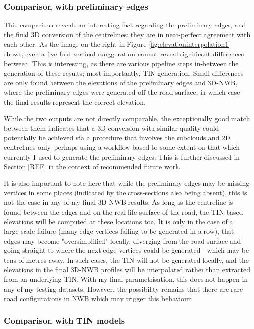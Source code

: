 \subsubsection{Comparison with preliminary edges}

This comparison reveals an interesting fact regarding the preliminary edges, and the final 3D conversion of the centrelines: they are in near-perfect agreement with each other. As the image on the right in Figure \ref{fig:elevationinterpolation1} shows, even a five-fold vertical exaggeration cannot reveal significant differences between. This is interesting, as there are various pipeline steps in-between the generation of these results; most importantly, TIN generation. Small differences are only found between the elevations of the preliminary edges and 3D-NWB, where the preliminary edges were generated off the road surface, in which case the final results represent the correct elevation.

While the two outputs are not directly comparable, the exceptionally good match between them indicates that a 3D conversion with similar quality could potentially be achieved via a procedure that involves the subclouds and 2D centrelines only, perhaps using a workflow based to some extent on that which currently I used to generate the preliminary edges. This is further discussed in Section [REF] in the context of recommended future work.

It is also important to note here that while the preliminary edges may be missing vertices in some places (indicated by the cross-sections also being absent), this is not the case in any of my final 3D-NWB results. As long as the centreline is found between the edges and on the real-life surface of the road, the TIN-based elevations will be computed at these locations too. It is only in the case of a large-scale failure (many edge vertices failing to be generated in a row), that edges may become "oversimplified" locally, diverging from the road surface and going straight to where the next edge vertices could be generated - which may be tens of metres away. In such cases, the TIN will not be generated locally, and the elevations in the final 3D-NWB profiles will be interpolated rather than extracted from an underlying TIN. With my final parametrisation, this does not happen in any of my testing datasets. However, the possibility remains that there are rare road configurations in NWB which may trigger this behaviour.

\subsubsection{Comparison with TIN models}

